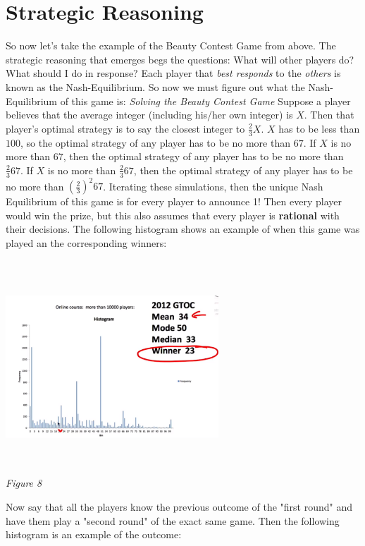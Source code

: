 \documentclass{article}
\begin{document}
\section{Strategic Reasoning}

So now let's take the example of the Beauty Contest Game from above. The strategic reasoning that emerges begs the questions: What will other players do? What should I do in response? Each player that \emph{best responds} to the \emph{others} is known as the Nash-Equilibrium. So now we must figure out what the Nash-Equilibrium of this game is:
\vskip 0.1in
\emph{Solving the Beauty Contest Game}
\vskip 0.1in
Suppose a player believes that the average integer (including his/her own integer) is \(X\). Then that player's optimal strategy is to say the closest integer to \(\frac{2}{3}X\). \(X\) has to be less than \(100\), so the optimal strategy of any player has to be no more than \(67\). If \(X\) is no more than \(67\), then the optimal strategy of any player has to be no more than \(\frac{2}{3}67\). If \(X\) is no more than \(\frac{2}{3}67\), then the optimal strategy of any player has to be no more than \((\frac{2}{3})^{2}67\). Iterating these simulations, then the unique Nash Equilibrium of this game is for every player to announce 1! Then every player would win the prize, but this also assumes that every player is \textbf{rational} with their decisions. The following histogram shows an example of when this game was played an the corresponding winners: 
\begin{center}
    \includegraphics[width = 8cm, height = 8cm]{IMG_008.png} \\
    \emph{Figure 8}
\end{center}
Now say that all the players know the previous outcome of the "first round" and have them play a "second round" of the exact same game. Then the following histogram is an example of the outcome: 
\end{document}
